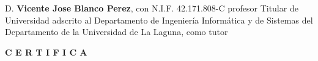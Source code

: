 \documentclass[spanish,a4paper,14pt,twoside]{report}
\begin{document}




            



\newpage{\pagestyle{empty}\cleardoublepage}

D. \textbf{Vicente Jose Blanco Perez}, con N.I.F. 42.171.808-C profesor Titular de Universidad adscrito al Departamento de Ingeniería Informática y de Sistemas del Departamento de la Universidad de La Laguna, como tutor \\
\vspace*{0.6in}

\textbf{C E R T I F I C A} \\
\end{document}
